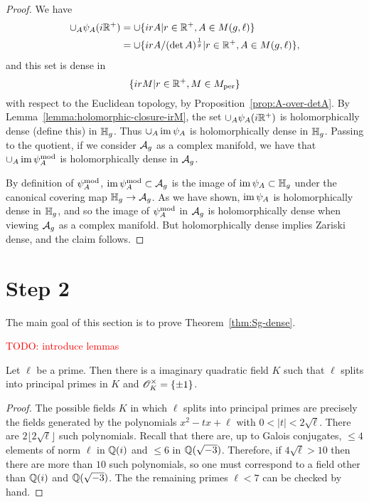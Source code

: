 \documentclass{amsart}
\begin{document}
\begin{proof}
  We have
  \begin{align*}
    \cup_A \psi_A(i\mathbb{R}^+) &= \cup \{irA | r \in \mathbb{R}^+, A \in M(g,\ell)\} \\
               &= \cup \{irA/(\det A)^{\frac{1}{g}} | r \in \mathbb{R}^+, A \in M(g,\ell)\},
  \end{align*}
  and this set is dense in
  \[
    \{irM | r \in \mathbb{R}^+, M \in M_{\textrm{per}}\}
  \]
with respect to the Euclidean topology,  by Proposition~\ref{prop:A-over-detA}.
  By Lemma~\ref{lemma:holomorphic-closure-irM}, the set $\cup_A \psi_A(i\mathbb{R}^+)$ is holomorphically dense (define this) in $\mathbb{H}_g$. Thus $\cup_A \operatorname{im} \psi_A$ is holomorphically dense in $\mathbb{H}_g$. Passing to the quotient, if we consider $\mathcal{A}_g$ as a complex manifold, we have that $\cup_A \operatorname{im} \psi_{A}^\mathrm{mod}$ is holomorphically dense in $\mathcal{A}_g$.

  By definition of $\psi_{A}^\mathrm{mod}$,  $\operatorname{im} \psi_{A}^\mathrm{mod} \subset \mathcal{A}_g$ is the image of $\operatorname{im} \psi_A \subset \mathbb{H}_g$ under the canonical covering map $\mathbb{H}_g \to \mathcal{A}_g$. As we have shown, $\operatorname{im} \psi_A$ is holomorphically dense in $\mathbb{H}_g$, and so the image of $\psi_{A}^\mathrm{mod}$ in $\mathcal{A}_g$ is holomorphically dense when viewing $\mathcal{A}_g$ as a complex manifold. But holomorphically dense implies Zariski dense, and the claim follows.
\end{proof}



\section{Step 2}
\label{sec:step-2}

The main goal of this section is to prove Theorem~\ref{thm:Sg-dense}.

\textcolor{red}{TODO: introduce lemmas}

\begin{lemma}\label{lem:silly}
  Let $\ell$ be a prime. Then there is a imaginary quadratic field $K$ such that $\ell$ splits into principal primes in $K$ and $\mathscr{O}_K^\times = \{\pm 1\}$.
\end{lemma}
\begin{proof}
  The possible fields $K$ in which $\ell$ splits into principal primes are precisely the fields generated by the polynomials $x^2 - tx + \ell$ with $0 < |t| < 2\sqrt{\ell}$. There are $2\lfloor 2\sqrt{\ell} \rfloor$ such polynomials. Recall that there are, up to Galois conjugates, $\leq 4$ elements of norm $\ell$ in $\mathbb{Q}(i)$ and $\leq 6$ in $\mathbb{Q}(\sqrt{-3})$. Therefore, if $4\sqrt{\ell} > 10$ then there are more than $10$ such polynomials, so one must correspond to a field other than $\mathbb{Q}(i)$ and $\mathbb{Q}(\sqrt{-3})$. The the remaining primes $\ell < 7$ can be checked by hand.
\end{proof}
\end{document}
